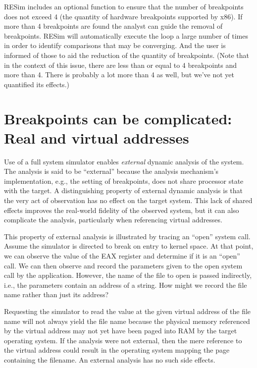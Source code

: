 \documentclass[titlepage]{article}
\begin{document}
RESim includes an optional function to ensure that the number of breakpoints does not exceed 4 (the quantity of hardware breakpoints supported by x86).  If more than 4 breakpoints are found the analyst can guide the removal of breakpoints. RESim will automatically execute the loop a large number of times in order to identify comparisons that may be converging.  And the user is informed of those to aid the reduction of the quantity of breakpoints.  (Note that in the context of this issue, there are less than or equal to 4 breakpoints and more than 4.  There is probably a lot more than 4 as well, but we've not yet quantified its effects.)

\section{Breakpoints can be complicated: Real and virtual addresses}
\label{external}
Use of a full system simulator enables \textit{external} dynamic analysis of the system.  The analysis is said to be
“external” because the analysis mechanism’s implementation, e.g., the setting of breakpoints,  does not 
share processor state with the target.
A distinguishing property of external dynamic analysis is that the very act of observation has no effect on the target
system.  This lack of shared effects improves the real-world fidelity of the observed system, but it can also complicate the
analysis, particularly when referencing virtual addresses. 

This property of external analysis is illustrated by tracing an “open” system call. 
Assume the simulator is directed to break on entry to kernel space.  At that point, we can observe the value
of the EAX register and determine if it is an “open” call.  We can then observe and record the
parameters given to the open system call by the application.  However, the name of the file to open
is passed indirectly, i.e., the parameters contain an address of a string.  How might we record
the file name rather than just its address?   

Requesting the simulator to read the value at the given virtual address of the
file name will not always yield the file name because the
physical memory referenced by the virtual address may not yet have been paged into RAM by the target operating system.
If the analysis were not external, then the mere reference to the virtual address could result in the
operating system mapping the page containing the filename.  An external analysis has no such side effects.
\end{document}
